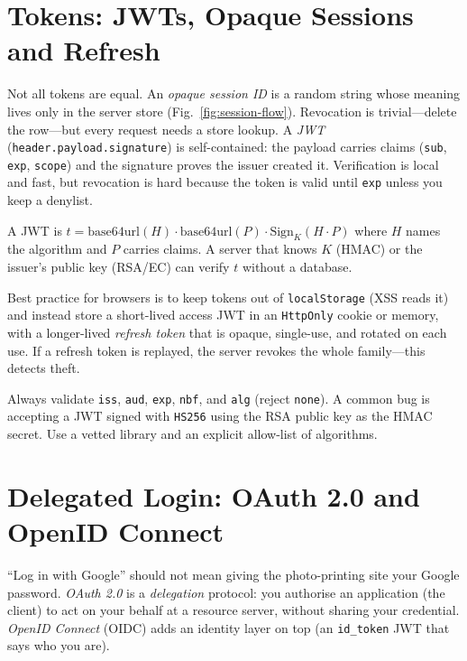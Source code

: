 \section{Tokens: JWTs, Opaque Sessions and Refresh}\label{sec:tokens}
Not all tokens are equal. An \emph{opaque session ID} is a random string whose meaning lives only in the server store (Fig.~\ref{fig:session-flow}). Revocation is trivial---delete the row---but every request needs a store lookup. A \emph{JWT} (\texttt{header.payload.signature}) is self-contained: the payload carries claims (\texttt{sub}, \texttt{exp}, \texttt{scope}) and the signature proves the issuer created it. Verification is local and fast, but revocation is hard because the token is valid until \texttt{exp} unless you keep a denylist.

\begin{definition}\label{def:jwt}
A JWT is $t = \text{base64url}(H)\cdot\text{base64url}(P)\cdot\text{Sign}_{K}(H\cdot P)$ where $H$ names the algorithm and $P$ carries claims. A server that knows $K$ (HMAC) or the issuer's public key (RSA/EC) can verify $t$ without a database.
\end{definition}

Best practice for browsers is to keep tokens out of \texttt{localStorage} (XSS reads it) and instead store a short-lived access JWT in an \texttt{HttpOnly} cookie or memory, with a longer-lived \emph{refresh token} that is opaque, single-use, and rotated on each use. If a refresh token is replayed, the server revokes the whole family---this detects theft.

\begin{remark}
Always validate \texttt{iss}, \texttt{aud}, \texttt{exp}, \texttt{nbf}, and \texttt{alg} (reject \texttt{none}). A common bug is accepting a JWT signed with \texttt{HS256} using the RSA public key as the HMAC secret. Use a vetted library and an explicit allow-list of algorithms.
\end{remark}

\section{Delegated Login: OAuth 2.0 and OpenID Connect}\label{sec:oauth}
``Log in with Google'' should not mean giving the photo-printing site your Google password. \emph{OAuth 2.0} is a \emph{delegation} protocol: you authorise an application (the client) to act on your behalf at a resource server, without sharing your credential. \emph{OpenID Connect} (OIDC) adds an identity layer on top (an \texttt{id\_token} JWT that says who you are).

